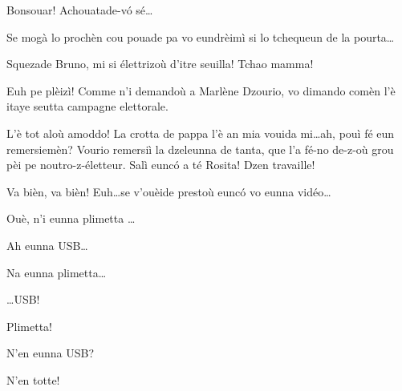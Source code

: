 \begin{drama}


\Brunospeaks {} Bonsouar! Achouatade-v\'o sé\ldots


\Brunospeaks Se mogà lo prochèn cou pouade pa vo eundrèimì si lo tchequeun de la pourta\ldots

\Jordyspeaks {} Squezade Bruno, mi si élettrizoù d'itre seuilla!  Tchao mamma!

\Brunospeaks {} Euh pe plèizì! Comme n'i demandoù a Marlène Dzourio, vo dimando comèn l'è itaye seutta campagne elettorale.

\Jordyspeaks L'è tot aloù amoddo! La crotta de pappa l'è an mia vouida mi\ldots ah, pouì fé eun remersiemèn? Vourio remersiì la dzeleunna de tanta, que l'a fé-no de-z-où grou pèi  pe noutro-z-életteur. Salì eunc\'o a té Rosita! Dzen travaille!

\Brunospeaks {} Va bièn, va bièn! Euh\ldots se v'ouèide prestoù eunc\'o vo eunna vidéo\ldots

\Jordyspeaks {} Ouè, n'i eunna plimetta \usb \ldots


\Brunospeaks  Ah eunna USB\ldots

\Jordyspeaks Na eunna plimetta\ldots

\Brunospeaks {} \ldots USB! 

\Jordyspeaks Plimetta!

\Brunospeaks{} N'en eunna USB?

\Noteospeaks N'en totte!


\end{drama}

